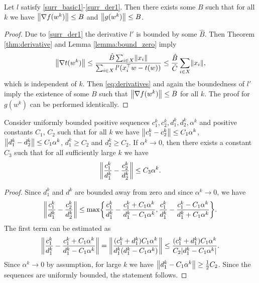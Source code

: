 \begin{lemma}\label{lemma:bound_g}
  Let $l$ satisfy \ref{surr_basic1}-\ref{surr_der1}. Then there exists some $B$ such that for all $k$ we have $\norm{\nabla f(w^k)}\le B$ and $\norm{g(w^k)}\le B$.
\end{lemma}
\begin{proof}
  Due to \ref{surr_der1} the derivative $l'$ is bounded by some $\hat B$. Then Theorem \ref{thm:derivative} and Lemma \ref{lemma:bound_zero} imply
  \begin{equation*}
    \norm{\nabla t(w^k)} \le \frac{\hat B\sum_{i\in X}\norm{x_i}
    }{\sum_{i\in X}l'(x_i^\top w-t(w))} \le \frac{\hat B}{\hat C}\sum_{i\in X}\norm{x_i},
  \end{equation*}
  which is independent of $k$. Then \eqref{eq:derivatives} and again the boundedness of $l'$ imply the existence of some $B$ such that $\norm{\nabla f(w^k)}\le B$ for all $k$. The proof for $g(w^k)$ can be performed identically.
\end{proof}

\begin{lemma}\label{lemma:ratio}
  Consider uniformly bounded positive sequences $c_1^k, c_2^k, d_1^k, d_2^k,\alpha^k$ and positive constants $C_1$, $C_2$ such that for all $k$ we have $\nrm{c_1^k-c_2^k}\le C_1\alpha^k$, $\nrm{d_1^k-d_2^k}\le C_1\alpha^k$, $d_1^k\ge C_2$ and $d_2^k\ge C_2$. If $\alpha^k\to 0$, then there exists a constant $C_3$ such that for all sufficiently large $k$ we have
  \begin{equation*}
    \norm{\frac{c_1^k}{d_1^k} - \frac{c_2^k}{d_2^k}} \le C_3\alpha^k.
  \end{equation*}
\end{lemma}

\begin{proof}
  Since $d_1^k$ and $d^k$ are bounded away from zero and since $\alpha^k\to 0$, we have
  \begin{equation*}
    \norm{\frac{c_1^k}{d_1^k} - \frac{c_2^k}{d_2^k}} \le \max\Brac[c]{ \frac{c_1^k}{d_1^k} - \frac{c_1^k+C_1\alpha^k}{d_1^k-C_1\alpha^k}, \frac{c_1^k}{d_1^k} - \frac{c_1^k-C_1\alpha^k}{d_1^k+C_1\alpha^k}}.
  \end{equation*}
  The first term can be estimated as
  \begin{equation*}
    \norm{\frac{c_1^k}{d_1^k} - \frac{c_1^k+C_1\alpha^k}{d_1^k-C_1\alpha^k}}
    = \norm{\frac{(c_1^k+d_1^k)C_1\alpha^k}{d_1^k(d_1^k-C_1\alpha^k)}}
    \le \frac{(c_1^k+d_1^k)C_1\alpha^k}{C_2|d_1^k-C_1\alpha^k|}.
  \end{equation*}
  Since $\alpha^k\to 0$ by assumption, for large $k$ we have $\nrm{d_1^k-C_1\alpha^k}\ge \frac{1}{2}C_2$. Since the sequences are uniformly bounded, the statement follows.
\end{proof}
  
